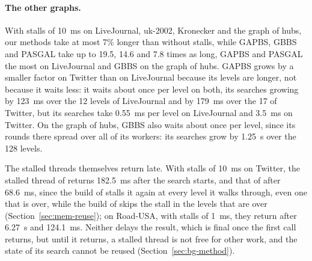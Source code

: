 \paragraph{The other graphs.} With stalls of 10~ms on LiveJournal, uk-2002, Kronecker and the graph of hubs, our methods take at most 7\% longer than without stalls, while GAPBS, GBBS and PASGAL take up to 19.5, 14.6 and 7.8 times as long, GAPBS and PASGAL the most on LiveJournal and GBBS on the graph of hubs. GAPBS grows by a smaller factor on Twitter than on LiveJournal because its levels are longer, not because it waits less: it waits about once per level on both, its searches growing by 123~ms over the 12 levels of LiveJournal and by 179~ms over the 17 of Twitter, but its searches take 0.55~ms per level on LiveJournal and 3.5~ms on Twitter. On the graph of hubs, GBBS also waits about once per level, since its rounds there spread over all of its workers: its searches grow by 1.25~s over the 128 levels.

The stalled threads themselves return late. With stalls of 10~ms on Twitter, the stalled thread of \wfdo returns 182.5~ms after the search starts, and that of \wfdomem after 68.6~ms, since the build of \wfdo stalls it again at every level it walks through, even one that is over, while the build of \wfdomem skips the stall in the levels that are over (Section~\ref{sec:mem-reuse}); on Road-USA, with stalls of 1~ms, they return after 6.27~s and 124.1~ms. Neither delays the result, which is final once the first call returns, but until it returns, a stalled thread is not free for other work, and the state of its search cannot be reused (Section~\ref{sec:bg-method}).

